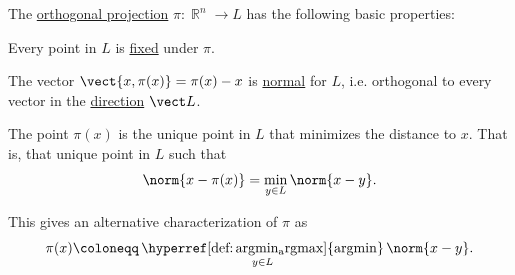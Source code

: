 \begin{proposition}\label{thm:def:orthogonal_projection}
  The \hyperref[def:orthogonal_projection]{orthogonal projection} \( \pi: \BbbR^n \to L \) has the following basic properties:

  \begin{thmenum}
     Every point in \( L \) is \hyperref[def:function_fixed_point]{fixed} under \( \pi \).

     The vector \( \vect{x,\pi(x)} = \pi(x) - x \) is \hyperref[def:normal_vector]{normal} for \( L \), i.e. orthogonal to every vector in the \hyperref[def:affine_subspace]{direction} \( \vect L \).

     The point \( \pi(x) \) is the unique point in \( L \) that minimizes the distance to \( x \). That is, that unique point in \( L \) such that
    \begin{equation*}
      \norm{ x - \pi(x) } = \min_{y \in L} \norm{ x - y }.
    \end{equation*}

    This gives an alternative characterization of \( \pi \) as
    \begin{equation}\label{eq:thm:def:orthogonal_projection/distance/argmin}
      \pi(x) \coloneqq \operatorname*{\hyperref[def:argmin_argmax]{argmin}}_{y \in L} \norm{ x - y }.
    \end{equation}
  \end{thmenum}
\end{proposition}
